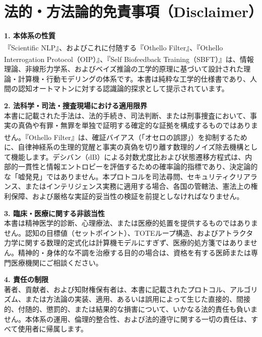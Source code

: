 \chapter*{法的・方法論的免責事項（Disclaimer）}
\noindent
\textbf{1. 本体系の性質}\\
『Scientific NLP\textsuperscript{\texttrademark}』、およびこれに付随する『Othello Filter\textsuperscript{\texttrademark}』、『Othello Interrogation Protocol\textsuperscript{\texttrademark}（OIP\textsuperscript{\texttrademark}）』、『Self Biofeedback Training\textsuperscript{\texttrademark}（SBFT\textsuperscript{\texttrademark}）』は、情報理論、非線形力学系、およびベイズ推論の工学的原理に基づいて設計された理論・計算機・行動モデリングの体系です。本書は純粋な工学的仕様書であり、人間の認知オートマトンに対する認識論的探求として提示されています。

\vspace{0.8em}
\noindent
\textbf{2. 法科学・司法・捜査現場における適用限界}\\
本書に記載された手法は、法的手続き、司法判断、または刑事捜査において、事実の真偽や有罪・無罪を単独で証明する確定的な証拠を構成するものではありません。『Othello Filter\textsuperscript{\texttrademark}』は、確証バイアス（「オセロの誤謬」）を抑制するために、自律神経系の生理的覚醒と事実の真偽を切り離す数理的ノイズ除去機構として機能します。デシバン（$\text{dB}$）による対数尤度比および状態遷移方程式は、内部的一貫性と情報エントロピーを評価するための確率論的指標であり、決定論的な「嘘発見」ではありません。本プロトコルを司法尋問、セキュリティクリアランス、またはインテリジェンス実務に適用する場合、各国の管轄法、憲法上の権利保障、および厳格な実証的妥当性の検証を前提としなければなりません。

\vspace{0.8em}
\noindent
\textbf{3. 臨床・医療に関する非該当性}\\
本書は精神医学的診断、心理療法、または医療的処置を提供するものではありません。認知の目標値（セットポイント）、TOTEループ構造、およびアトラクタ力学に関する数理的定式化は計算機モデルにすぎず、医療的処方箋ではありません。精神的・身体的な不調を治療する目的の場合は、資格を有する医師または専門医療機関にご相談ください。

\vspace{0.8em}
\noindent
\textbf{4. 責任の制限}\\
著者、貢献者、および知財権保有者は、本書に記載されたプロトコル、アルゴリズム、または方法論の実装、適用、あるいは誤用によって生じた直接的、間接的、付随的、懲罰的、または結果的な損害について、いかなる法的責任も負いません。本体系の運用、倫理的整合性、および法的遵守に関する一切の責任は、すべて使用者に帰属します。


